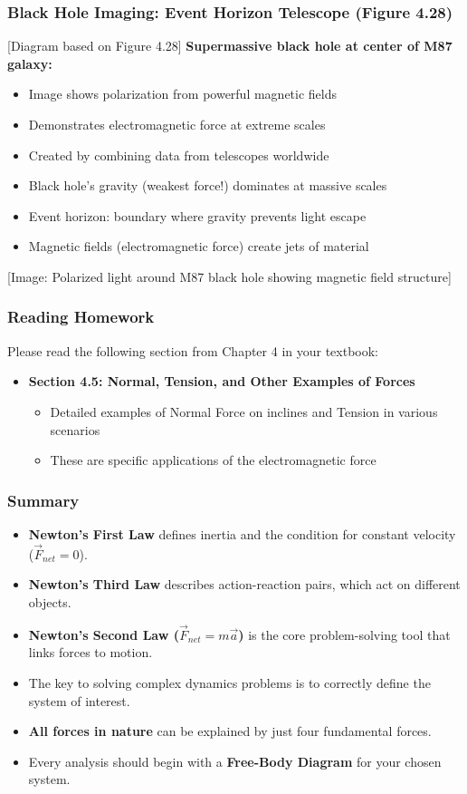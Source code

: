 \documentclass{beamer}
\begin{document}
\begin{frame}
\frametitle{Black Hole Imaging: Event Horizon Telescope (Figure 4.28)}
\begin{alertblock}{[Diagram based on Figure 4.28]}
\textbf{Supermassive black hole at center of M87 galaxy:}
\begin{itemize}
    \item Image shows polarization from powerful magnetic fields
    \item Demonstrates electromagnetic force at extreme scales
    \item Created by combining data from telescopes worldwide
    \item Black hole's gravity (weakest force!) dominates at massive scales
    \item Event horizon: boundary where gravity prevents light escape
    \item Magnetic fields (electromagnetic force) create jets of material
\end{itemize}
\alert{[Image: Polarized light around M87 black hole showing magnetic field structure]}
\end{alertblock}
\end{frame}

\begin{frame}
\frametitle{Reading Homework}
Please read the following section from Chapter 4 in your textbook:
\begin{itemize}
    \item \textbf{Section 4.5: Normal, Tension, and Other Examples of Forces}
    \begin{itemize}
        \item Detailed examples of Normal Force on inclines and Tension in various scenarios
        \item These are specific applications of the electromagnetic force
    \end{itemize}
\end{itemize}
\end{frame}

\begin{frame}
\frametitle{Summary}
\begin{itemize}
    \item \textbf{Newton's First Law} defines inertia and the condition for constant velocity ($\vec{F}_{net}=0$). \pause
    \item \textbf{Newton's Third Law} describes action-reaction pairs, which act on different objects. \pause
    \item \textbf{Newton's Second Law ($\vec{F}_{net}=m\vec{a}$)} is the core problem-solving tool that links forces to motion. \pause
    \item The key to solving complex dynamics problems is to correctly \alert{define the system of interest}. \pause
    \item \textbf{All forces in nature} can be explained by just four fundamental forces. \pause
    \item Every analysis should begin with a \textbf{Free-Body Diagram} for your chosen system.
\end{itemize}
\end{frame}
\end{document}
